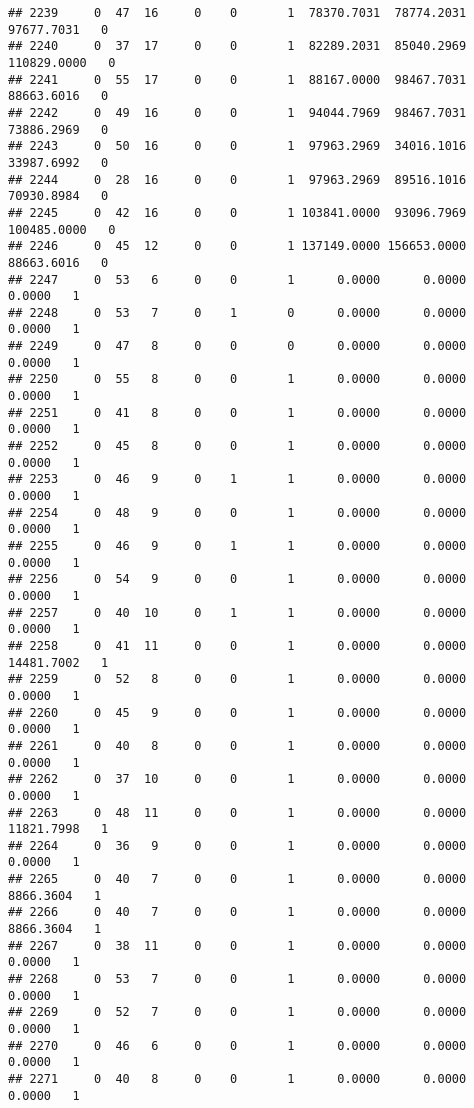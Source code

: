 \documentclass[
]{article}
\begin{document}
\begin{enumerate}
\begin{verbatim}
## 2239     0  47  16     0    0       1  78370.7031  78774.2031  97677.7031   0
## 2240     0  37  17     0    0       1  82289.2031  85040.2969 110829.0000   0
## 2241     0  55  17     0    0       1  88167.0000  98467.7031  88663.6016   0
## 2242     0  49  16     0    0       1  94044.7969  98467.7031  73886.2969   0
## 2243     0  50  16     0    0       1  97963.2969  34016.1016  33987.6992   0
## 2244     0  28  16     0    0       1  97963.2969  89516.1016  70930.8984   0
## 2245     0  42  16     0    0       1 103841.0000  93096.7969 100485.0000   0
## 2246     0  45  12     0    0       1 137149.0000 156653.0000  88663.6016   0
## 2247     0  53   6     0    0       1      0.0000      0.0000      0.0000   1
## 2248     0  53   7     0    1       0      0.0000      0.0000      0.0000   1
## 2249     0  47   8     0    0       0      0.0000      0.0000      0.0000   1
## 2250     0  55   8     0    0       1      0.0000      0.0000      0.0000   1
## 2251     0  41   8     0    0       1      0.0000      0.0000      0.0000   1
## 2252     0  45   8     0    0       1      0.0000      0.0000      0.0000   1
## 2253     0  46   9     0    1       1      0.0000      0.0000      0.0000   1
## 2254     0  48   9     0    0       1      0.0000      0.0000      0.0000   1
## 2255     0  46   9     0    1       1      0.0000      0.0000      0.0000   1
## 2256     0  54   9     0    0       1      0.0000      0.0000      0.0000   1
## 2257     0  40  10     0    1       1      0.0000      0.0000      0.0000   1
## 2258     0  41  11     0    0       1      0.0000      0.0000  14481.7002   1
## 2259     0  52   8     0    0       1      0.0000      0.0000      0.0000   1
## 2260     0  45   9     0    0       1      0.0000      0.0000      0.0000   1
## 2261     0  40   8     0    0       1      0.0000      0.0000      0.0000   1
## 2262     0  37  10     0    0       1      0.0000      0.0000      0.0000   1
## 2263     0  48  11     0    0       1      0.0000      0.0000  11821.7998   1
## 2264     0  36   9     0    0       1      0.0000      0.0000      0.0000   1
## 2265     0  40   7     0    0       1      0.0000      0.0000   8866.3604   1
## 2266     0  40   7     0    0       1      0.0000      0.0000   8866.3604   1
## 2267     0  38  11     0    0       1      0.0000      0.0000      0.0000   1
## 2268     0  53   7     0    0       1      0.0000      0.0000      0.0000   1
## 2269     0  52   7     0    0       1      0.0000      0.0000      0.0000   1
## 2270     0  46   6     0    0       1      0.0000      0.0000      0.0000   1
## 2271     0  40   8     0    0       1      0.0000      0.0000      0.0000   1

\end{verbatim}
\end{enumerate}
\end{document}
